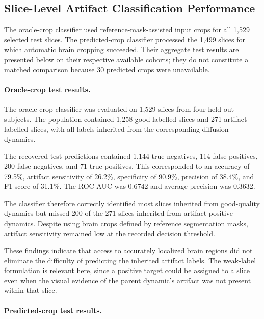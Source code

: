 \subsection{Slice-Level Artifact Classification Performance}

The oracle-crop classifier used reference-mask-assisted input crops for all 1,529 selected test slices. The predicted-crop classifier processed the 1,499 slices for which automatic brain cropping succeeded. Their aggregate test results are presented below on their respective available cohorts; they do not constitute a matched comparison because 30 predicted crops were unavailable.

\paragraph{Oracle-crop test results.}
\label{subsec:results_oracle_classification}

The oracle-crop classifier was evaluated on 1,529 slices from four held-out subjects. The population contained 1,258 good-labelled slices and 271 artifact-labelled slices, with all labels inherited from the corresponding diffusion dynamics.

The recovered test predictions contained 1,144 true negatives, 114 false positives, 200 false negatives, and 71 true positives. This corresponded to an accuracy of 79.5\%, artifact sensitivity of 26.2\%, specificity of 90.9\%, precision of 38.4\%, and F1-score of 31.1\%. The ROC-AUC was 0.6742 and average precision was 0.3632.

The classifier therefore correctly identified most slices inherited from good-quality dynamics but missed 200 of the 271 slices inherited from artifact-positive dynamics. Despite using brain crops defined by reference segmentation masks, artifact sensitivity remained low at the recorded decision threshold.

These findings indicate that access to accurately localized brain regions did not eliminate the difficulty of predicting the inherited artifact labels. The weak-label formulation is relevant here, since a positive target could be assigned to a slice even when the visual evidence of the parent dynamic's artifact was not present within that slice.

\paragraph{Predicted-crop test results.}
\label{subsec:results_predicted_crop_classification}

